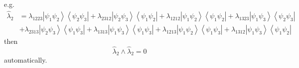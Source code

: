\documentclass[aps,preprint]{revtex4}%
\begin{document}
\begin{itemize}
e.g.
\begin{align}
\hat{\lambda}_{2}  &  =\lambda_{1223}\left\vert \psi_{1}\psi_{2}\right\rangle
\left\langle \psi_{2}\psi_{3}\right\vert +\lambda_{2312}\left\vert \psi
_{2}\psi_{3}\right\rangle \left\langle \psi_{1}\psi_{2}\right\vert
+\lambda_{1212}\left\vert \psi_{1}\psi_{2}\right\rangle \left\langle \psi
_{1}\psi_{2}\right\vert +\lambda_{1323}\left\vert \psi_{1}\psi_{3}%
\right\rangle \left\langle \psi_{2}\psi_{3}\right\vert \nonumber\\
&  +\lambda_{2313}\left\vert \psi_{2}\psi_{3}\right\rangle \left\langle
\psi_{1}\psi_{3}\right\vert +\lambda_{1313}\left\vert \psi_{1}\psi
_{3}\right\rangle \left\langle \psi_{1}\psi_{3}\right\vert +\lambda
_{1213}\left\vert \psi_{1}\psi_{2}\right\rangle \left\langle \psi_{1}\psi
_{3}\right\vert +\lambda_{1312}\left\vert \psi_{1}\psi_{3}\right\rangle
\left\langle \psi_{1}\psi_{2}\right\vert
\end{align}
then
\begin{equation}
\hat{\lambda}_{2}\wedge\hat{\lambda}_{2}=0
\end{equation}
automatically.


\end{itemize}
\end{document}
